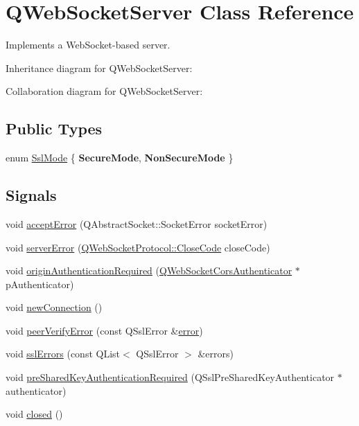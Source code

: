 \hypertarget{class_q_web_socket_server}{}\section{Q\+Web\+Socket\+Server Class Reference}
\label{class_q_web_socket_server}


Implements a Web\+Socket-\/based server.  




Inheritance diagram for Q\+Web\+Socket\+Server\+:


Collaboration diagram for Q\+Web\+Socket\+Server\+:
\subsection*{Public Types}
\begin{DoxyCompactItemize}
\item 
enum \mbox{\hyperlink{class_q_web_socket_server_a07ce392fd4fa351746e48b00428366b8}{Ssl\+Mode}} \{ {\bfseries Secure\+Mode}, 
{\bfseries Non\+Secure\+Mode}
 \}
\end{DoxyCompactItemize}
\subsection*{Signals}
\begin{DoxyCompactItemize}
\item 
void \mbox{\hyperlink{class_q_web_socket_server_a660076e922f44bad48b57b7926593060}{accept\+Error}} (Q\+Abstract\+Socket\+::\+Socket\+Error socket\+Error)
\item 
void \mbox{\hyperlink{class_q_web_socket_server_ae0252a3e66f2f1c7e80b99508390df24}{server\+Error}} (\mbox{\hyperlink{namespace_q_web_socket_protocol_a9f236676f594451d8d723f260b71028c}{Q\+Web\+Socket\+Protocol\+::\+Close\+Code}} close\+Code)
\item 
void \mbox{\hyperlink{class_q_web_socket_server_adcd6db6ae81db4d88081c4113a47c3a4}{origin\+Authentication\+Required}} (\mbox{\hyperlink{class_q_web_socket_cors_authenticator}{Q\+Web\+Socket\+Cors\+Authenticator}} $\ast$p\+Authenticator)
\item 
void \mbox{\hyperlink{class_q_web_socket_server_ae8023d4b4b3df6884e8fe363010fba85}{new\+Connection}} ()
\item 
void \mbox{\hyperlink{class_q_web_socket_server_aa80990116026e853dee6aefcf728bf45}{peer\+Verify\+Error}} (const Q\+Ssl\+Error \&\mbox{\hyperlink{class_q_web_socket_server_ad7db68dd641e6a5ff0c40b8b4788e1fc}{error}})
\item 
void \mbox{\hyperlink{class_q_web_socket_server_a53d7949bf17ea46f265cc099e762bffb}{ssl\+Errors}} (const Q\+List$<$ Q\+Ssl\+Error $>$ \&errors)
\item 
void \mbox{\hyperlink{class_q_web_socket_server_a6d9d92d366e222e3c3ae94ffc2bae0b4}{pre\+Shared\+Key\+Authentication\+Required}} (Q\+Ssl\+Pre\+Shared\+Key\+Authenticator $\ast$authenticator)
\item 
void \mbox{\hyperlink{class_q_web_socket_server_abb62d368b25890b8fab13d8272a6e47c}{closed}} ()
\end{DoxyCompactItemize}
